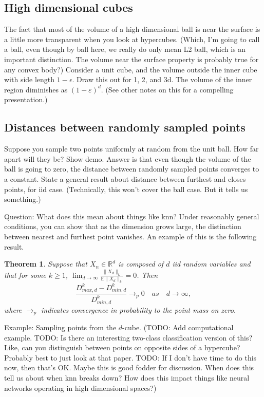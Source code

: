 \documentclass{book}
\newtheorem{theorem}{Theorem}
\newcommand{\R}{\mathbb{R}}
\newcommand{\E}{\mathbb{E}}
\newcommand{\eps}{\varepsilon}
\begin{document}
\subsection{High dimensional cubes}
The fact that most of the volume of a high dimensional ball is near the surface is a little more transparent when you look at hypercubes. (Which, I'm going to call a ball, even though by ball here, we really do only mean L2 ball, which is an important distinction. The volume near the surface property is probably true for any convex body?) 
Consider a unit cube, and the volume outside the inner cube with side length $1-\epsilon$. Draw this out for 1, 2, and 3d. The volume of the inner region diminishes as $(1-\eps)^d$. (See other notes on this for a compelling presentation.) 


\subsection{Distances between randomly sampled points}
Suppose you sample two points uniformly at random from the unit ball. How far apart will they be? Show demo. Answer is that even though the volume of the ball is going to zero, the distance between randomly sampled points converges to a constant. State a general result about distance between furthest and closes points, for iid case. (Technically, this won't cover the ball case. But it tells us something.) 

Question: What does this mean about things like knn? Under reasonably general conditions, you can show that as the dimension grows large, the distinction between nearest and furthest point vanishes. An example of this is the following result. 
\begin{theorem}
Suppose that $X_n\in \R^d$ is composed of $d$ iid random variables and that for some $k\geq 1$, $\lim_{d\to\infty} \frac{\|X_d\|_k}{\E \|X_d\|_k} = 0$. Then 
$$
\frac{D_{max, d}^k - D_{min, d}^k}{D_{min, d}^k} \to_{p} 0 \quad as \quad d\to \infty,
$$
where $\to_p$ indicates convergence in probability to the point mass on zero. 
\end{theorem}

Example: Sampling points from the $d$-cube. (TODO: Add computational example. TODO: Is there an interesting two-class classification version of this? Like, can you distinguish between points on opposite sides of a hypercube? Probably best to just look at that paper. TODO: If I don't have time to do this now, then that's OK. Maybe this is good fodder for discussion. When does this tell us about when knn breaks down? How does this impact things like neural networks operating in high dimensional spaces?)  
\end{document}
